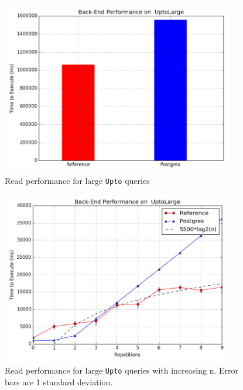 \documentclass[12pt,a4paper,twoside,openright]{report}
\newcommand\codeName[1]{\texttt{#1}}
\begin{document}
 \begin{figure}[ht]
\centering
  \includegraphics[width=0.9\textwidth]{scripts/UptoLarge.png}
  \caption{Read performance for large \codeName{Upto} queries}
  \label{fig:UptoLargeResults}
\end{figure}

 \begin{figure}[ht]
\centering
  \includegraphics[width=0.9\textwidth]{scripts/UptoLargeTrend.png}
  \caption{Read performance for large \codeName{Upto} queries with increasing n. Error bars are 1 standard deviation.}
  \label{fig:UptoLargeTrend}
\end{figure}
	
\end{document}
